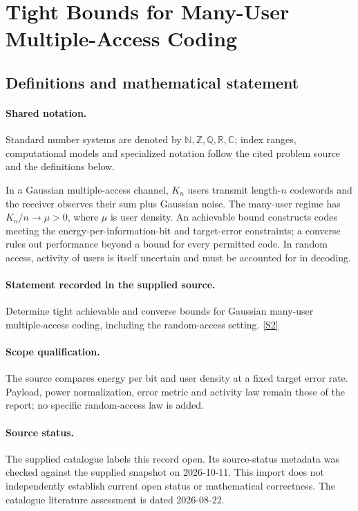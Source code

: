 \documentclass[11pt]{article}
\newcommand{\sref}[2]{\hyperlink{source:#1:#2}{[S#2]}}
\begin{document}
\section{Tight Bounds for Many-User Multiple-Access Coding}\label{statement}

\subsection{Definitions and mathematical statement}

\paragraph{Shared notation.}Standard number systems are denoted by $\mathbb N,\mathbb Z,\mathbb Q,\mathbb R,\mathbb C$; index ranges, computational models and specialized notation follow the cited problem source and the definitions below.


In a Gaussian multiple-access channel, $K_n$ users transmit length-$n$ codewords and the receiver observes their sum plus Gaussian noise. The many-user regime has $K_n/n\to\mu>0$, where $\mu$ is user density. An achievable bound constructs codes meeting the energy-per-information-bit and target-error constraints; a converse rules out performance beyond a bound for every permitted code. In random access, activity of users is itself uncertain and must be accounted for in decoding.
\paragraph{Statement recorded in the supplied source.}
Determine tight achievable and converse bounds for Gaussian many-user multiple-access coding, including the random-access setting. \sref{statement}{2}
\paragraph{Scope qualification.}
The source compares energy per bit and user density at a fixed target error rate. Payload, power normalization, error metric and activity law remain those of the report; no specific random-access law is added.
\paragraph{Source status.}
The supplied catalogue labels this record open. Its source-status metadata was checked against the supplied snapshot on 2026-10-11. This import does not independently establish current open status or mathematical correctness. The catalogue literature assessment is dated 2026-08-22.
\end{document}
